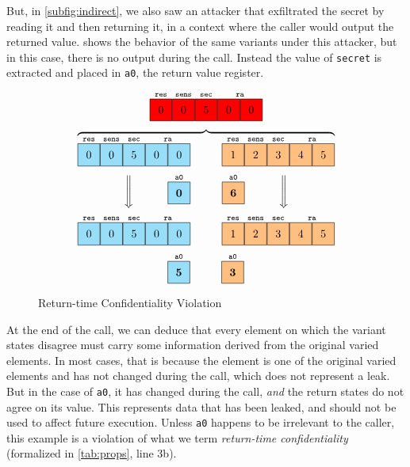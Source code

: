 \documentclass[10pt,conference]{ieeetran}%
\theoremstyle{definition}
\begin{document}
But, in \cref{subfig:indirect}, we also saw an attacker that exfiltrated the secret
by reading it and then returning it, in a context where the caller would output the returned
value.  shows the behavior of the same variants under this attacker,
but in this case, there is no output during the call. Instead the value of {\tt secret} is
extracted and placed in {\tt a0}, the return value register.
%
\begin{figure}
    \centering
    \[
    \stackrel{\texttt{res}}{\figfourbox[0]}
    \stackrel{\texttt{sens}}{\figfourbox[0]}
    \stackrel{\texttt{sec}}{\figfourbox[5]}
    \stackrel{\texttt{ra}}{\figfourbox[0]\figfourbox[0]}\]
    \[\overbrace{
    \stackrel{\texttt{res}}{\leftbox[0]}
    \stackrel{\texttt{sens}}{\leftbox[0]}
    \stackrel{\texttt{sec}}{\leftbox[5]}
    \stackrel{\texttt{ra}}{\leftbox[0]\leftbox[0]}
    \hspace{1cm}
    \stackrel{\texttt{res}}{\rightbox[1]}
    \stackrel{\texttt{sens}}{\rightbox[2]}
    \stackrel{\texttt{sec}}{\rightbox[3]}
    \stackrel{\texttt{ra}}{\rightbox[4]\rightbox[5]}}
    \]
    \[\raisebox{.5\height}{\Bigg\Downarrow} \hspace{1cm} \stackrel{\mathtt{a0}}{\leftbox[\bf 0]} \hspace{1cm}
    \stackrel{\mathtt{a0}}{\rightbox[\bf 6]} \hspace{1cm} \raisebox{.5\height}{\Bigg\Downarrow}\]
    \[
    \stackrel{\texttt{res}}{\leftbox[0]}
    \stackrel{\texttt{sens}}{\leftbox[0]}
    \stackrel{\texttt{sec}}{\leftbox[5]}
    \stackrel{\texttt{ra}}{\leftbox[0]\leftbox[0]}
    \hspace{1cm}
    \stackrel{\texttt{res}}{\rightbox[1]}
    \stackrel{\texttt{sens}}{\rightbox[2]}
    \stackrel{\texttt{sec}}{\rightbox[3]}
    \stackrel{\texttt{ra}}{\rightbox[4]\rightbox[5]}
    \]
    \[\stackrel{\mathtt{a0}}{\leftbox[\bf 5]} \hspace{1cm}
    \stackrel{\mathtt{a0}}{\rightbox[\bf 3]}\]
  \caption{Return-time Confidentiality Violation}
  \label{fig:variant3}
\end{figure}

At the end of the call, we can deduce that every element on which
the variant states disagree must carry some information derived from
the original varied elements. In most cases, that is because the element
is one of the original varied elements and has not changed during the
call, which does not represent a leak. But in the case of {\tt a0}, it
has changed during the call, {\em and} the return states do not agree
on its value. This represents data that has been leaked, and should
not be used to affect future execution.
Unless {\tt a0} happens to be irrelevant to the caller, this example
is a violation of what we term {\it return-time confidentiality}
(formalized in \cref{tab:props}, line 3b).
\end{document}
